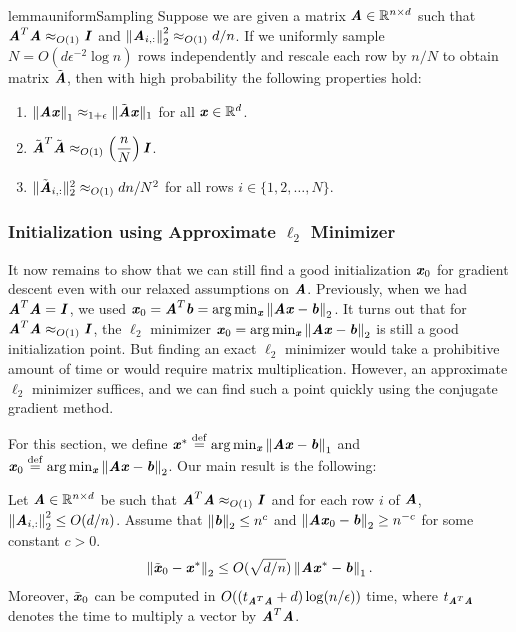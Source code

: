 \begin{restatable}[]{lemma}{uniformSampling}
	\label{lem:uniformSampling}
	Suppose we are given a matrix $\AA \in \R^{n \times d}$ such that $\AA^T\AA \approx_{O(1)} \II$ and $\norme{\AA_{i,:}}^2 \approx_{O(1)} d/n$.
	If we uniformly sample $N = O(d\epsilon^{-2}\log{n})$ rows independently and rescale each row by $n/N$ to obtain matrix $\tilde{\AA}$, then with high probability the following properties hold:
	\begin{enumerate}
		\item $\norm{\AA\xx}_1 \approx_{1 + \epsilon} \|\tilde{\AA}\xx\|_1$ for all $\xx \in \R^d$.
		\item $\tilde{\AA}^T\tilde{\AA} \approx_{O(1)} \left(\dfrac{n}{N}\right)\II$.
		\item $\|\tilde{\AA}_{i,:}\|_2^2 \approx_{O(1)} dn/N^2$ for all rows $i \in \{1,2,\ldots, N\}$.
	\end{enumerate}
\end{restatable}






\subsubsection*{Initialization using Approximate $\ell_2$ Minimizer}\label{subsec:l2Minimizer}
It now remains to show that we can still find a good initialization $\xx_0$ for gradient descent even with our relaxed assumptions on $\AA$.
Previously, when we had $\AA^T \AA = \II$, we used $\xx_0 = \AA^T \bb = \arg \min_{\xx} \norme{\AA \xx - \bb}$.
It turns out that for $\AA^T \AA \approx_{O(1)} \II$, the $\ell_2$ minimizer $\xx_0 = \arg \min_{\xx} \norme{\AA \xx - \bb}$ is still a good initialization point.
But finding an exact $\ell_2$ minimizer would take a prohibitive amount of time or would require matrix multiplication.
However, an approximate $\ell_2$ minimizer suffices, and we can find such a point quickly using the conjugate gradient method.

For this section, we define $\xx^* \defeq \arg\min_{\xx} \norm{\AA\xx - \bb}_1$ and $\xx_0 \defeq \arg \min_{\xx} \norme{\AA\xx - \bb}$. Our main result is the following:

\begin{lemma} \label{lem:initMain} Let $\AA \in \R^{n \times d}$ be such that $\AA^T \AA \approx_{O(1)} \II$ and for each row $i$ of $\AA$, $\norme{\AA_{i,:}}^2 \leq O(d/n)$. Assume that $\norme{\bb} \le n^c$ and $\norme{\AA\xx_0 - \bb} \ge n^{-c}$ for some constant $c > 0$.
	\begin{align*}
	\norme{\tilde{\xx}_0 - \xx^*} \le O(\sqrt{d/n}) \norm{\AA \xx^* - \bb}_1.
	\end{align*}
	Moreover, $\tilde{\xx}_0$ can be computed in  $O( (t_{\AA^T \AA} + d) \log (n/ \epsilon))$ time, where $t_{\AA^T \AA}$ denotes the time to multiply a vector by $\AA^T \AA$. 
\end{lemma}

